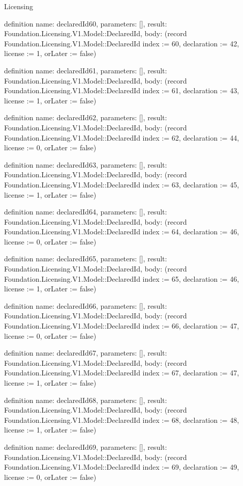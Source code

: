 \begin{lexlean}{Licensing}
\begin{semanticmodule}
definition{
  name: declaredId60,
  parameters: [],
  result: Foundation.Licensing.V1.Model::DeclaredId,
  body: (record Foundation.Licensing.V1.Model::DeclaredId {index := 60, declaration := 42, license := 1, orLater := false})
}

definition{
  name: declaredId61,
  parameters: [],
  result: Foundation.Licensing.V1.Model::DeclaredId,
  body: (record Foundation.Licensing.V1.Model::DeclaredId {index := 61, declaration := 43, license := 1, orLater := false})
}

definition{
  name: declaredId62,
  parameters: [],
  result: Foundation.Licensing.V1.Model::DeclaredId,
  body: (record Foundation.Licensing.V1.Model::DeclaredId {index := 62, declaration := 44, license := 0, orLater := false})
}

definition{
  name: declaredId63,
  parameters: [],
  result: Foundation.Licensing.V1.Model::DeclaredId,
  body: (record Foundation.Licensing.V1.Model::DeclaredId {index := 63, declaration := 45, license := 1, orLater := false})
}

definition{
  name: declaredId64,
  parameters: [],
  result: Foundation.Licensing.V1.Model::DeclaredId,
  body: (record Foundation.Licensing.V1.Model::DeclaredId {index := 64, declaration := 46, license := 0, orLater := false})
}

definition{
  name: declaredId65,
  parameters: [],
  result: Foundation.Licensing.V1.Model::DeclaredId,
  body: (record Foundation.Licensing.V1.Model::DeclaredId {index := 65, declaration := 46, license := 1, orLater := false})
}

definition{
  name: declaredId66,
  parameters: [],
  result: Foundation.Licensing.V1.Model::DeclaredId,
  body: (record Foundation.Licensing.V1.Model::DeclaredId {index := 66, declaration := 47, license := 0, orLater := false})
}

definition{
  name: declaredId67,
  parameters: [],
  result: Foundation.Licensing.V1.Model::DeclaredId,
  body: (record Foundation.Licensing.V1.Model::DeclaredId {index := 67, declaration := 47, license := 1, orLater := false})
}

definition{
  name: declaredId68,
  parameters: [],
  result: Foundation.Licensing.V1.Model::DeclaredId,
  body: (record Foundation.Licensing.V1.Model::DeclaredId {index := 68, declaration := 48, license := 1, orLater := false})
}

definition{
  name: declaredId69,
  parameters: [],
  result: Foundation.Licensing.V1.Model::DeclaredId,
  body: (record Foundation.Licensing.V1.Model::DeclaredId {index := 69, declaration := 49, license := 0, orLater := false})
}


\end{semanticmodule}
\end{lexlean}
